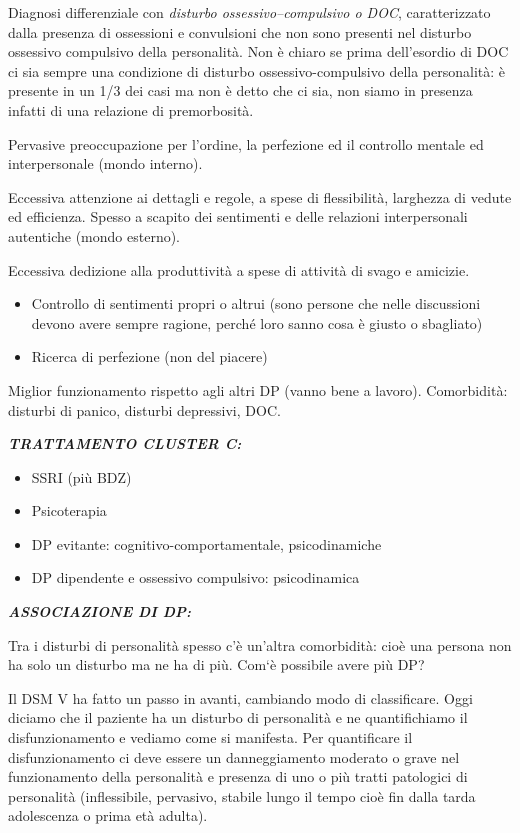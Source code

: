 \documentclass[]{article}
\begin{document}
Diagnosi differenziale con \emph{disturbo ossessivo--compulsivo o DOC},
caratterizzato dalla presenza di ossessioni e convulsioni che non sono
presenti nel disturbo ossessivo compulsivo della personalità. Non è
chiaro se prima dell'esordio di DOC ci sia sempre una condizione di
disturbo ossessivo-compulsivo della personalità: è presente in un 1/3
dei casi ma non è detto che ci sia, non siamo in presenza infatti di una
relazione di premorbosità.

Pervasive preoccupazione per l'ordine, la perfezione ed il controllo
mentale ed interpersonale (mondo interno).

Eccessiva attenzione ai dettagli e regole, a spese di flessibilità,
larghezza di vedute ed efficienza. Spesso a scapito dei sentimenti e
delle relazioni interpersonali autentiche (mondo esterno).

Eccessiva dedizione alla produttività a spese di attività di svago e
amicizie.

\begin{itemize}
\item
  Controllo di sentimenti propri o altrui (sono persone che nelle
  discussioni devono avere sempre ragione, perché loro sanno cosa è
  giusto o sbagliato)
\item
  Ricerca di perfezione (non del piacere)
\end{itemize}

Miglior funzionamento rispetto agli altri DP (vanno bene a lavoro).
Comorbidità: disturbi di panico, disturbi depressivi, DOC.

\textbf{\emph{TRATTAMENTO CLUSTER C:}}

\begin{itemize}
\item
  SSRI (più BDZ)
\item
  Psicoterapia
\end{itemize}

\begin{itemize}
\item
  DP evitante: cognitivo-comportamentale, psicodinamiche
\item
  DP dipendente e ossessivo compulsivo: psicodinamica
\end{itemize}

\textbf{\emph{ASSOCIAZIONE DI DP: }}

Tra i disturbi di personalità spesso c'è un'altra comorbidità: cioè una
persona non ha solo un disturbo ma ne ha di più. Com`è possibile avere
più DP?

Il DSM V ha fatto un passo in avanti, cambiando modo di classificare.
Oggi diciamo che il paziente ha un disturbo di personalità e ne
quantifichiamo il disfunzionamento e vediamo come si manifesta. Per
quantificare il disfunzionamento ci deve essere un danneggiamento
moderato o grave nel funzionamento della personalità e presenza di uno o
più tratti patologici di personalità (inflessibile, pervasivo, stabile
lungo il tempo cioè fin dalla tarda adolescenza o prima età adulta).
\end{document}

